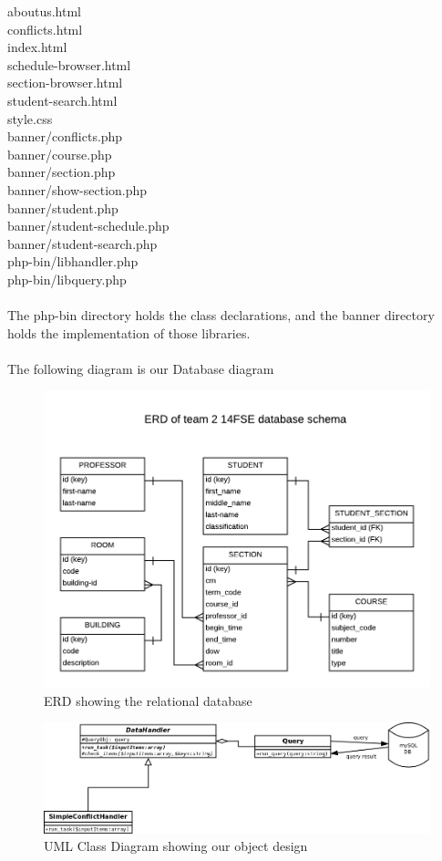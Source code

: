 \documentclass[11pt]{article}
\begin{document}
aboutus.html\\
conflicts.html\\
index.html\\
schedule-browser.html\\
section-browser.html\\
student-search.html\\
style.css\\
banner/conflicts.php\\
banner/course.php\\
banner/section.php\\
banner/show-section.php\\
banner/student.php\\
banner/student-schedule.php\\
banner/student-search.php\\
php-bin/libhandler.php\\
php-bin/libquery.php\\ \\
The php-bin directory holds the class declarations, and the banner directory holds the implementation of those libraries. \\ \\
The following diagram is our Database diagram\\
\begin{figure}[h]
  \centering
  \includegraphics[width=.75\textwidth]{diagrams/ERD_current.png}
  \caption{ERD showing the relational database}
\end{figure}

\begin{figure}[h]
  \centering
  \includegraphics[width=.75\textwidth]{diagrams/SEproject.png}
  \caption{UML Class Diagram showing our object design}
\end{figure}
\end{document}

